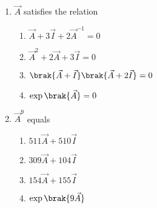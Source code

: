 \begin{enumerate}
\item  $\vec{A}$ satisfies the relation
\begin{multicols}{2}
\begin{enumerate}
    \item  $\vec{A} + 3\vec{I} + 2\vec{A}^{-1} = 0$ 
 \item  $\vec{A}^2 + 2\vec{A} + 3\vec{I} = 0$
 \item  $\brak{\vec{A} + \vec{I}}\brak{\vec{A} + 2\vec{I}} = 0$ 
 \item  $\exp\brak{\vec{A}} = 0$ 
\end{enumerate}
\end{multicols}
%
\item  $\vec{A}^9$ equals
\begin{multicols}{4}
\begin{enumerate}
\item $511 \vec{A} + 510 \vec{I}$
\item $309 \vec{A} + 104 \vec{I}$
\item $154 \vec{A} + 155 \vec{I}$
\item $\exp\brak{9\vec{A}}$ 
\end{enumerate}
\end{multicols}
\end{enumerate}

